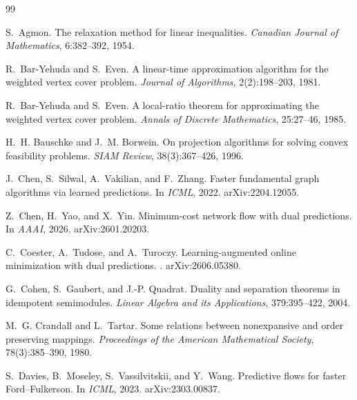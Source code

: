 \begin{thebibliography}{99}

S.~Agmon.
\newblock The relaxation method for linear inequalities.
\newblock \emph{Canadian Journal of Mathematics}, 6:382--392, 1954.

R.~Bar-Yehuda and S.~Even.
\newblock A linear-time approximation algorithm for the weighted vertex cover problem.
\newblock \emph{Journal of Algorithms}, 2(2):198--203, 1981.

R.~Bar-Yehuda and S.~Even.
\newblock A local-ratio theorem for approximating the weighted vertex cover problem.
\newblock \emph{Annals of Discrete Mathematics}, 25:27--46, 1985.

H.~H. Bauschke and J.~M. Borwein.
\newblock On projection algorithms for solving convex feasibility problems.
\newblock \emph{SIAM Review}, 38(3):367--426, 1996.

J.~Chen, S.~Silwal, A.~Vakilian, and F.~Zhang.
\newblock Faster fundamental graph algorithms via learned predictions.
\newblock In \emph{ICML}, 2022. arXiv:2204.12055.

Z.~Chen, H.~Yao, and X.~Yin.
\newblock Minimum-cost network flow with dual predictions.
\newblock In \emph{AAAI}, 2026. arXiv:2601.20203.

C.~Coester, A.~Tudose, and A.~Turoczy.
\newblock Learning-augmented online minimization with dual predictions.
. arXiv:2606.05380.

G.~Cohen, S.~Gaubert, and J.-P. Quadrat.
\newblock Duality and separation theorems in idempotent semimodules.
\newblock \emph{Linear Algebra and its Applications}, 379:395--422, 2004.

M.~G. Crandall and L.~Tartar.
\newblock Some relations between nonexpansive and order preserving mappings.
\newblock \emph{Proceedings of the American Mathematical Society}, 78(3):385--390, 1980.

S.~Davies, B.~Moseley, S.~Vassilvitskii, and Y.~Wang.
\newblock Predictive flows for faster Ford--Fulkerson.
\newblock In \emph{ICML}, 2023. arXiv:2303.00837.


\end{thebibliography}

